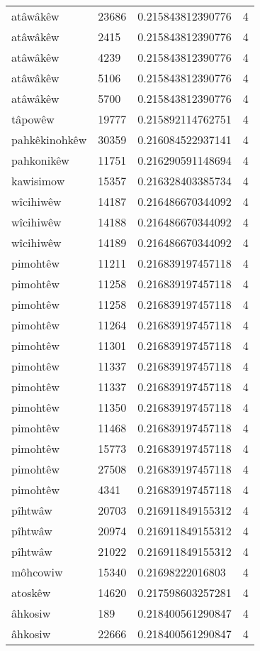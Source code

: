 \begin{longtable}{llll}
atâwâkêw & 23686 & 0.215843812390776 & 4 \\
atâwâkêw & 2415 & 0.215843812390776 & 4 \\
atâwâkêw & 4239 & 0.215843812390776 & 4 \\
atâwâkêw & 5106 & 0.215843812390776 & 4 \\
atâwâkêw & 5700 & 0.215843812390776 & 4 \\
tâpowêw & 19777 & 0.215892114762751 & 4 \\
pahkêkinohkêw & 30359 & 0.216084522937141 & 4 \\
pahkonikêw & 11751 & 0.216290591148694 & 4 \\
kawisimow & 15357 & 0.216328403385734 & 4 \\
wîcihiwêw & 14187 & 0.216486670344092 & 4 \\
wîcihiwêw & 14188 & 0.216486670344092 & 4 \\
wîcihiwêw & 14189 & 0.216486670344092 & 4 \\
pimohtêw & 11211 & 0.216839197457118 & 4 \\
pimohtêw & 11258 & 0.216839197457118 & 4 \\
pimohtêw & 11258 & 0.216839197457118 & 4 \\
pimohtêw & 11264 & 0.216839197457118 & 4 \\
pimohtêw & 11301 & 0.216839197457118 & 4 \\
pimohtêw & 11337 & 0.216839197457118 & 4 \\
pimohtêw & 11337 & 0.216839197457118 & 4 \\
pimohtêw & 11350 & 0.216839197457118 & 4 \\
pimohtêw & 11468 & 0.216839197457118 & 4 \\
pimohtêw & 15773 & 0.216839197457118 & 4 \\
pimohtêw & 27508 & 0.216839197457118 & 4 \\
pimohtêw & 4341 & 0.216839197457118 & 4 \\
pîhtwâw & 20703 & 0.216911849155312 & 4 \\
pîhtwâw & 20974 & 0.216911849155312 & 4 \\
pîhtwâw & 21022 & 0.216911849155312 & 4 \\
môhcowiw & 15340 & 0.21698222016803 & 4 \\
atoskêw & 14620 & 0.217598603257281 & 4 \\
âhkosiw & 189 & 0.218400561290847 & 4 \\
âhkosiw & 22666 & 0.218400561290847 & 4 \\

\end{longtable}

